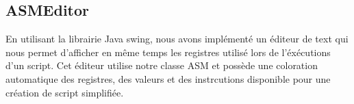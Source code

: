 \documentclass{article}
\begin{document}
\subsection{ASMEditor}
En utilisant la librairie Java swing, nous avons implémenté un éditeur de text qui nous permet d'afficher en même temps
les registres utilisé lors de l'éxécutions d'un script. Cet éditeur utilise notre classe ASM et possède une coloration automatique
des registres, des valeurs et des instrcutions disponible pour une création de script simplifiée.
\end{document}
